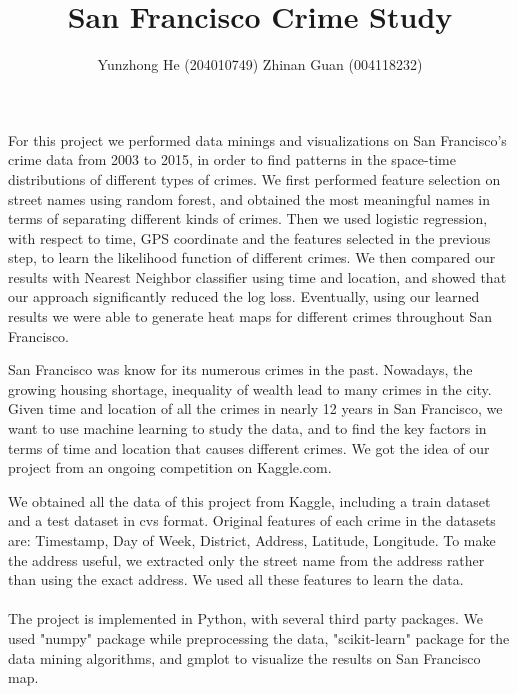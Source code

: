 \documentclass[12pt]{article}
\newenvironment{abs}[2][Part I Abstract]{\begin{trivlist}
\item[\hskip \labelsep {\bfseries #1}\hskip \labelsep {\bfseries #2}]}{\end{trivlist}}
\newenvironment{p1}[2][Part II Motivation]{\begin{trivlist}
\item[\hskip \labelsep {\bfseries #1}\hskip \labelsep {\bfseries #2}]}{\end{trivlist}}
\newenvironment{p2}[2][Part III Data and Software Tools]{\begin{trivlist}
\item[\hskip \labelsep {\bfseries #1}\hskip \labelsep {\bfseries #2}]}{\end{trivlist}}
\begin{document}
 
 
\title{San Francisco Crime Study}
\author{Yunzhong He (204010749) Zhinan Guan (004118232)}
\maketitle

\begin{abs}{}
\item{}
For this project we performed data minings and visualizations on San Francisco's crime data from 2003 to 2015, in order to find patterns in the space-time distributions of different types of crimes. We first performed feature selection on street names using random forest, and obtained the most meaningful names in terms of separating different kinds of crimes. Then we used logistic regression, with respect to time, GPS coordinate and the features selected in the previous step, to learn the likelihood function of different crimes. We then compared our results with Nearest Neighbor classifier using time and location, and showed that our approach significantly reduced the log loss. Eventually, using our learned results we were able to generate heat maps for different crimes throughout San Francisco.
\end{abs}

\begin{p1}{}
\item{}
San Francisco was know for its numerous crimes in the past. Nowadays, the growing housing shortage,  inequality of wealth lead to many crimes in the city. Given time and location of all the crimes in nearly 12 years in San Francisco, we want to use machine learning to study the data, and to find the key factors in terms of time and location that causes different crimes. We got the idea of our project from an ongoing competition on Kaggle.com. 
\end{p1}

\begin{p2}{}
\item{}
We obtained all the data of this project from Kaggle, including a train dataset and a test dataset in cvs format. Original features of each crime in the datasets are: Timestamp, Day of Week, District, Address, Latitude, Longitude. To make the address useful, we extracted only the street name from the address rather than using the exact address. We used all these features to learn the data.\\\\
The project is implemented in Python, with several third party packages. We used "numpy" package while preprocessing the data, "scikit-learn" package for the data mining algorithms, and gmplot to visualize the results on San Francisco map. 
\end{p2}
\end{document}
